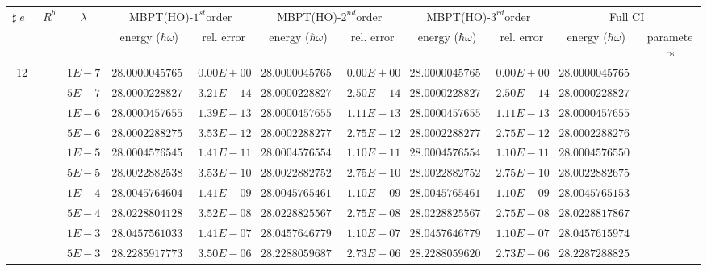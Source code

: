 \begin{landscape}
\begin{table}[ht]
\centering      %
{\tiny
\begin{tabular}[c]{c|c|c|c|c|c|c|c|c|c|c} 
\toprule[1pt]
\multicolumn{1}{c|}{$\sharp \; e^{-}$}  & \multicolumn{1}{c|}{$R^b$} & \multicolumn{1}{c|}{$\lambda$} & \multicolumn{2}{c|}{MBPT(HO)-$1^{st}$order}& \multicolumn{2}{c|}{MBPT(HO)-$2^{nd}$order}& \multicolumn{2}{c|}{MBPT(HO)-$3^{rd}$order}& \multicolumn{2}{c}{Full CI}\\
\multicolumn{1}{c|}{}  & \multicolumn{1}{c|}{} & \multicolumn{1}{c|}{} & \multicolumn{1}{c|}{energy ($\hbar \omega$)}& \multicolumn{1}{c|}{rel. error} & \multicolumn{1}{c|}{energy ($\hbar \omega$)}& \multicolumn{1}{c|}{rel. error}& \multicolumn{1}{c|}{energy ($\hbar \omega$)} &\multicolumn{1}{c|}{rel. error}& \multicolumn{1}{c|}{energy ($\hbar \omega$)}& \multicolumn{1}{c}{parameters}\\
\hline
\multirow{56}{*}{12} & &$1E-7$ & $28.000004576555$ & $0.00E+00$ & $28.000004576555$ & $0.00E+00$ & $28.000004576555$ & $0.00E+00$ & $28.000004576555$ & \\
& &$5E-7$ & $28.000022882772$ & $3.21E-14$ & $28.000022882774$ & $2.50E-14$ & $28.000022882774$ & $2.50E-14$ & $28.000022882774$ & \\
& &$1E-6$ & $28.000045765540$ & $1.39E-13$ & $28.000045765548$ & $1.11E-13$ & $28.000045765548$ & $1.11E-13$ & $28.000045765545$ & \\
& &$5E-6$ & $28.000228827509$ & $3.53E-12$ & $28.000228827724$ & $2.75E-12$ & $28.000228827724$ & $2.75E-12$ & $28.000228827646$ & \\
& &$1E-5$ & $28.000457654546$ & $1.41E-11$ & $28.000457655403$ & $1.10E-11$ & $28.000457655403$ & $1.10E-11$ & $28.000457655095$ & \\
& &$5E-5$ & $28.002288253834$ & $3.53E-10$ & $28.002288275275$ & $2.75E-10$ & $28.002288275275$ & $2.75E-10$ & $28.002288267575$ & \\
& &$1E-4$ & $28.004576460432$ & $1.41E-09$ & $28.004576546194$ & $1.10E-09$ & $28.004576546194$ & $1.10E-09$ & $28.004576515396$ & \\
& &$5E-4$ & $28.022880412872$ & $3.52E-08$ & $28.022882556758$ & $2.75E-08$ & $28.022882556751$ & $2.75E-08$ & $28.022881786724$ & \\
& &$1E-3$ & $28.045756103306$ & $1.41E-07$ & $28.045764677986$ & $1.10E-07$ & $28.045764677933$ & $1.10E-07$ & $28.045761597478$ & \\
& &$5E-3$ & $28.228591777300$ & $3.50E-06$ & $28.228805968749$ & $2.73E-06$ & $28.228805962013$ & $2.73E-06$ & $28.228728882585$ & \\

\end{tabular}}
\end{table}
\end{landscape}
